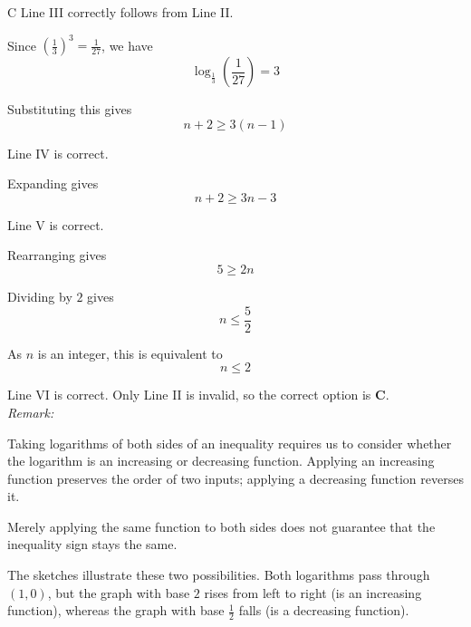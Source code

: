 \documentclass[11pt,a4paper]{article}
\begin{document}
\begin{enumerate}[label=\textbf{\arabic*.},leftmargin=*,itemsep=0pt,start=8]
\begin{djsSolution}{C}
Line III correctly follows from Line II.

Since $\left(\frac13\right)^3=\frac1{27}$, we have
\[
\log_{\frac13}\left(\frac1{27}\right)=3
\]

Substituting this gives
\[
n+2\ge3(n-1)
\]

Line IV is correct.

Expanding gives
\[
n+2\ge3n-3
\]

Line V is correct.

Rearranging gives
\[
5\ge2n
\]

Dividing by $2$ gives
\[
n\le\frac52
\]

As $n$ is an integer, this is equivalent to
\[
n\le2
\]

Line VI is correct. Only Line II is invalid, so the correct option is \textbf{C}.\\[5pt]

\textit{Remark:}

Taking logarithms of both sides of an inequality requires us to consider whether the logarithm is an increasing or decreasing function. Applying an increasing function preserves the order of two inputs; applying a decreasing function reverses it. 

Merely applying the same function to both sides does not guarantee that the inequality sign stays the same.

The sketches illustrate these two possibilities. Both logarithms pass through $(1,0)$, but the graph with base $2$ rises from left to right (is an increasing function), whereas the graph with base $\frac12$ falls (is a decreasing function).


\end{djsSolution}
\end{enumerate}
\end{document}
